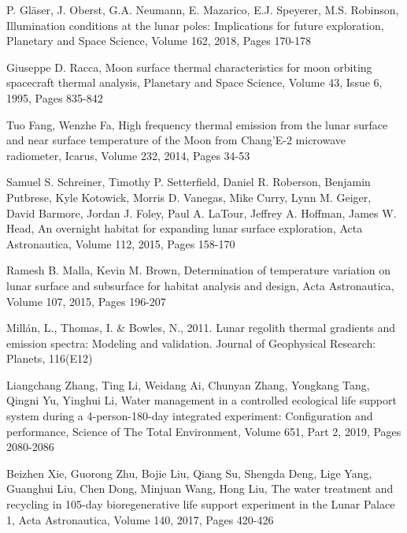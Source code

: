 \documentclass[prl,onecolumn]{revtex4-1}  %
\begin{document}
\begin{thebibliography}{99}

P. Gl{\"a}ser, J. Oberst, G.A. Neumann, E. Mazarico, E.J. Speyerer, M.S. Robinson,
Illumination conditions at the lunar poles: Implications for future exploration,
Planetary and Space Science,
Volume 162,
2018,
Pages 170-178

Giuseppe D. Racca,
Moon surface thermal characteristics for moon orbiting spacecraft thermal analysis,
Planetary and Space Science,
Volume 43, Issue 6,
1995,
Pages 835-842



Tuo Fang, Wenzhe Fa,
High frequency thermal emission from the lunar surface and near surface temperature of the Moon from Chang’E-2 microwave radiometer,
Icarus,
Volume 232,
2014,
Pages 34-53



Samuel S. Schreiner, Timothy P. Setterfield, Daniel R. Roberson, Benjamin Putbrese, Kyle Kotowick, Morris D. Vanegas, Mike Curry, Lynn M. Geiger, David Barmore, Jordan J. Foley, Paul A. LaTour, Jeffrey A. Hoffman, James W. Head,
An overnight habitat for expanding lunar surface exploration,
Acta Astronautica,
Volume 112,
2015,
Pages 158-170



Ramesh B. Malla, Kevin M. Brown,
Determination of temperature variation on lunar surface and subsurface for habitat analysis and design,
Acta Astronautica,
Volume 107,
2015,
Pages 196-207


 Mill{\'a}n, L., Thomas, I. \& Bowles, N., 2011. Lunar regolith thermal gradients and emission spectra: Modeling and validation. Journal of Geophysical Research: Planets, 116(E12)


Liangchang Zhang, Ting Li, Weidang Ai, Chunyan Zhang, Yongkang Tang, Qingni Yu, Yinghui Li,
Water management in a controlled ecological life support system during a 4-person-180-day integrated experiment: Configuration and performance,
Science of The Total Environment,
Volume 651, Part 2,
2019,
Pages 2080-2086


Beizhen Xie, Guorong Zhu, Bojie Liu, Qiang Su, Shengda Deng, Lige Yang, Guanghui Liu, Chen Dong, Minjuan Wang, Hong Liu,
The water treatment and recycling in 105-day bioregenerative life support experiment in the Lunar Palace 1,
Acta Astronautica,
Volume 140,
2017,
Pages 420-426



\end{thebibliography}
\end{document}

